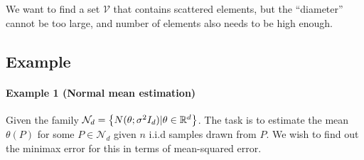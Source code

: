 \documentclass[11pt,a4paper]{article}
\begin{document}
{\blue We want to find a set $\mathcal{V}$ that contains scattered elements, but the ``diameter'' cannot be too large, and number of elements also needs to be high enough.}

\subsection{Example}%
\label{sub:example}

\paragraph{Example 1 (Normal mean estimation)}  Given the family $\mathcal{N}_d = \left\{N(\theta; \sigma^2 I_d) | \theta \in \mathbb{R}^{d}\right\}$.
The task is to estimate the mean $\theta(P)$ for some $P \in \mathcal{N}_d$ given $n$ i.i.d samples drawn from $P$. 
We wish to find out the minimax error for this in terms of mean-squared error.
\end{document}
